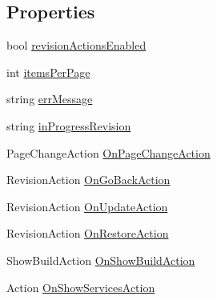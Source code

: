 \subsection*{Properties}
\begin{DoxyCompactItemize}
\item 
bool \mbox{\hyperlink{class_unity_editor_1_1_collaboration_1_1_tests_1_1_test_history_window_a67ba9048c478720cc6a8c0add533232a}{revision\+Actions\+Enabled}}
\item 
int \mbox{\hyperlink{class_unity_editor_1_1_collaboration_1_1_tests_1_1_test_history_window_a9d04fd55f3a51e9792e8d158caefa801}{items\+Per\+Page}}
\item 
string \mbox{\hyperlink{class_unity_editor_1_1_collaboration_1_1_tests_1_1_test_history_window_a4e9d369ea53f55fd8f27283b876202c1}{err\+Message}}
\item 
string \mbox{\hyperlink{class_unity_editor_1_1_collaboration_1_1_tests_1_1_test_history_window_a82fc71893d8afab27c74b590851cf7f9}{in\+Progress\+Revision}}
\item 
Page\+Change\+Action \mbox{\hyperlink{class_unity_editor_1_1_collaboration_1_1_tests_1_1_test_history_window_a66823c1ff04b14a4a124d26a9819ec43}{On\+Page\+Change\+Action}}
\item 
Revision\+Action \mbox{\hyperlink{class_unity_editor_1_1_collaboration_1_1_tests_1_1_test_history_window_afb9c488cb012687d02307ad926c872ea}{On\+Go\+Back\+Action}}
\item 
Revision\+Action \mbox{\hyperlink{class_unity_editor_1_1_collaboration_1_1_tests_1_1_test_history_window_ac10eb4e6d99658a40c08ef1570398033}{On\+Update\+Action}}
\item 
Revision\+Action \mbox{\hyperlink{class_unity_editor_1_1_collaboration_1_1_tests_1_1_test_history_window_a3f23b3e6a7ece762b19df21bd8d0cc9d}{On\+Restore\+Action}}
\item 
Show\+Build\+Action \mbox{\hyperlink{class_unity_editor_1_1_collaboration_1_1_tests_1_1_test_history_window_aba91eb3ffb5ed2d32099f0dee4df6ecb}{On\+Show\+Build\+Action}}
\item 
Action \mbox{\hyperlink{class_unity_editor_1_1_collaboration_1_1_tests_1_1_test_history_window_a184442eb092bb9831f82cf1f02e9685e}{On\+Show\+Services\+Action}}
\end{DoxyCompactItemize}


